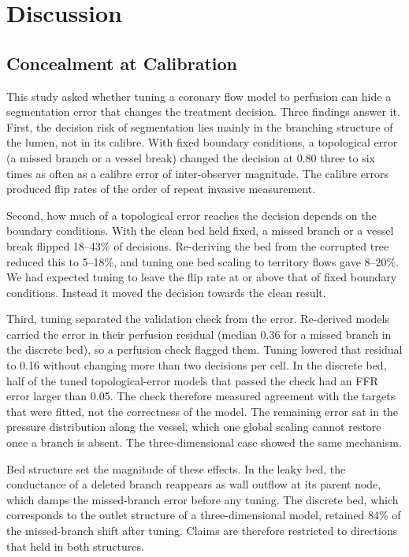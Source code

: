 \documentclass[journal]{IEEEtran}
\begin{document}
\section{Discussion}
\subsection{Concealment at Calibration}
This study asked whether tuning a coronary flow model to perfusion can hide a segmentation error that changes the
treatment decision. Three findings answer it. First, the decision risk of segmentation lies mainly in the branching structure of the lumen, not in its calibre.
With fixed boundary conditions, a topological error (a missed branch or a vessel break) changed the decision at
0.80 three to six times as often as a calibre error of inter-observer magnitude. The calibre errors produced flip
rates of the order of repeat invasive measurement.

Second, how much of a topological error reaches the decision depends on the boundary conditions. With the clean bed
held fixed, a missed branch or a vessel break flipped 18--43\% of decisions. Re-deriving the bed from the corrupted
tree reduced this to 5--18\%, and tuning one bed scaling to territory flows gave 8--20\%. We had expected tuning to
leave the flip rate at or above that of fixed boundary conditions. Instead it moved the decision towards the clean
result.

Third, tuning separated the validation check from the error. Re-derived models carried the error in their perfusion
residual (median 0.36 for a missed branch in the discrete bed), so a perfusion check flagged them. Tuning lowered
that residual to 0.16 without changing more than two decisions per cell. In the discrete bed, half of the tuned
topological-error models that passed the check had an FFR error larger than 0.05. The check therefore measured
agreement with the targets that were fitted, not the correctness of the model. The remaining error sat in the
pressure distribution along the vessel, which one global scaling cannot restore once a branch is absent. The three-dimensional case showed the same mechanism.

Bed structure set the magnitude of these effects. In the leaky bed, the conductance of a deleted branch reappears
as wall outflow at its parent node, which damps the missed-branch error before any tuning. The discrete bed, which
corresponds to the outlet structure of a three-dimensional model, retained 84\% of the missed-branch shift after
tuning. Claims are therefore restricted to directions that held in both structures.
\end{document}
